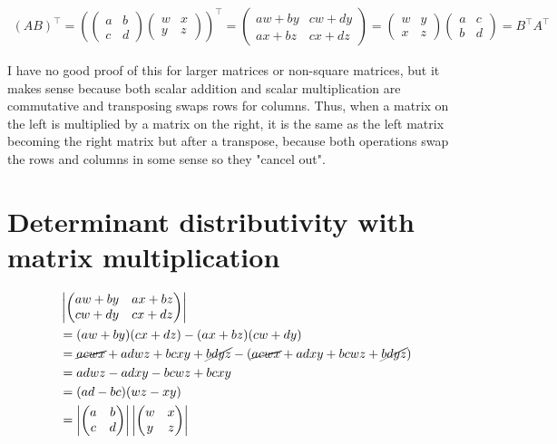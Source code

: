 \documentclass[letterpaper]{article}
\begin{document}
\[\begin{aligned}
  (AB)^\top =\left(\begin{pmatrix}a&b\\c&d\end{pmatrix}\begin{pmatrix}w&x\\y&z\end{pmatrix}\right) ^\top
  =\begin{pmatrix}aw+by & cw+dy \\ ax + bz & cx + dz \end{pmatrix} =\begin{pmatrix}w&y\\x&z\end{pmatrix}\begin{pmatrix}a&c\\b&d\end{pmatrix} = B^\top A^\top
  \end{aligned}\]

I have no good proof of this for larger matrices or non-square matrices, but it makes sense because both scalar addition and scalar multiplication are commutative and transposing swaps rows for columns. Thus, when a matrix on the left is multiplied by a matrix on the right, it is the same as the left matrix becoming the right matrix but after a transpose, because both operations swap the rows and columns in some sense so they "cancel out".
\section{Determinant distributivity with matrix multiplication}
\label{sec:orge3516ec}

\[\begin{aligned}
  &\left| \begin{pmatrix}aw+by & ax + bz\\ cw + dy & cx + dz\end{pmatrix} \right|   \\
  &= (aw+by)(cx+dz) - (ax+bz)(cw+dy) \\
  &= \cancel{acwx} + adwz + bcxy + \cancel{bdyz} - (\cancel{acwx} + adxy + bcwz + \cancel{bdyz}) \\
  &= adwz - adxy - bcwz + bcxy\\
  &= (ad-bc)(wz-xy) \\
  &= \left|\begin{pmatrix}a&b\\c&d\end{pmatrix}\right|\left|\begin{pmatrix}w&x\\y&z\end{pmatrix}\right|
  \end{aligned}\]
\end{document}
